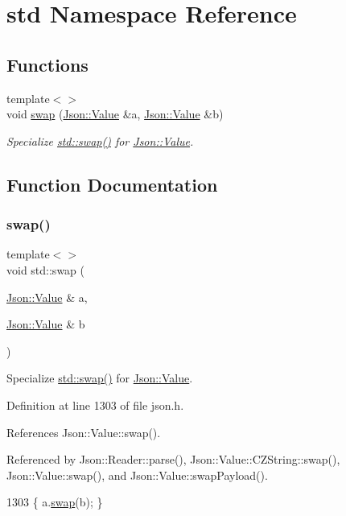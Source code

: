 \hypertarget{namespacestd}{}\section{std Namespace Reference}
\label{namespacestd}
\subsection*{Functions}
\begin{DoxyCompactItemize}
\item 
{\footnotesize template$<$$>$ }\\void \hyperlink{namespacestd_a22cc6fcbbb1f2f705c7888b615e43582}{swap} (\hyperlink{class_json_1_1_value}{Json\+::\+Value} \&a, \hyperlink{class_json_1_1_value}{Json\+::\+Value} \&b)
\begin{DoxyCompactList}\small\item\em Specialize \hyperlink{namespacestd_a22cc6fcbbb1f2f705c7888b615e43582}{std\+::swap()} for \hyperlink{class_json_1_1_value}{Json\+::\+Value}. \end{DoxyCompactList}\end{DoxyCompactItemize}


\subsection{Function Documentation}
\mbox{\label{namespacestd_a22cc6fcbbb1f2f705c7888b615e43582}} 
\subsubsection{\texorpdfstring{swap()}{swap()}}
{\footnotesize\ttfamily template$<$$>$ \\
void std\+::swap (\begin{DoxyParamCaption}\item[{\hyperlink{class_json_1_1_value}{Json\+::\+Value} \&}]{a,  }\item[{\hyperlink{class_json_1_1_value}{Json\+::\+Value} \&}]{b }\end{DoxyParamCaption})\hspace{0.3cm}{\ttfamily [inline]}}



Specialize \hyperlink{namespacestd_a22cc6fcbbb1f2f705c7888b615e43582}{std\+::swap()} for \hyperlink{class_json_1_1_value}{Json\+::\+Value}. 



Definition at line 1303 of file json.\+h.



References Json\+::\+Value\+::swap().



Referenced by Json\+::\+Reader\+::parse(), Json\+::\+Value\+::\+C\+Z\+String\+::swap(), Json\+::\+Value\+::swap(), and Json\+::\+Value\+::swap\+Payload().


\begin{DoxyCode}
1303 \{ a.\hyperlink{class_json_1_1_value_aab841120d78e296e1bc06a373345e822}{swap}(b); \}
\end{DoxyCode}
